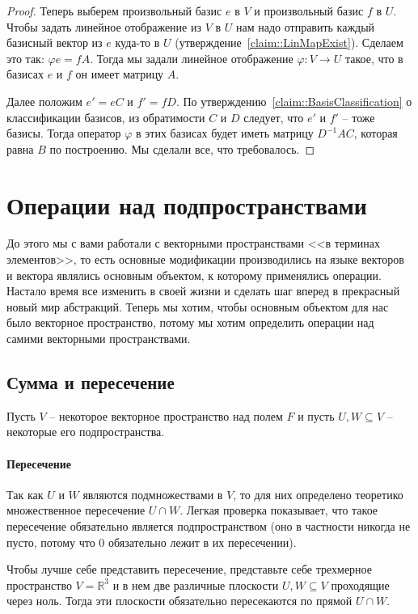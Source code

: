 \begin{proof}
Теперь выберем произвольный базис $e$ в $V$ и произвольный базис $f$ в $U$.
Чтобы задать линейное отображение из $V$ в $U$ нам надо отправить каждый базисный вектор из $e$ куда-то в $U$ (утверждение~\ref{claim::LinMapExist}).
Сделаем это так: $\varphi e = f A$.
Тогда мы задали линейное отображение $\varphi \colon V\to U$ такое, что в базисах $e$ и $f$ он имеет матрицу $A$.

Далее положим $e' = eC$ и $f' = fD$.
По утверждению~\ref{claim::BasisClassification} о классификации базисов, из обратимости $C$ и $D$ следует, что $e'$ и $f'$ -- тоже базисы.
Тогда оператор $\varphi$ в этих базисах будет иметь матрицу $D^{-1}AC$, которая равна $B$ по построению.
Мы сделали все, что требовалось.
\end{proof}


\newpage
\section{Операции над подпространствами}

До этого мы с вами работали с векторными пространствами <<в терминах элементов>>, то есть основные модификации производились на языке векторов и вектора являлись основным объектом, к которому применялись операции.
Настало время все изменить в своей жизни и сделать шаг вперед в прекрасный новый мир абстракций.
Теперь мы хотим, чтобы основным объектом для нас было векторное пространство, потому мы хотим определить операции над самими векторными пространствами.

\subsection{Сумма и пересечение}

Пусть $V$ -- некоторое векторное пространство над полем $F$ и пусть $U, W \subseteq V$ -- некоторые его подпространства.

\paragraph{Пересечение}

Так как $U$ и $W$ являются подмножествами в $V$, то для них определено теоретико множественное пересечение $U\cap W$.
Легкая проверка показывает, что такое пересечение обязательно является подпространством (оно в частности никогда не пусто, потому что $0$ обязательно лежит в их пересечении).

Чтобы лучше себе представить пересечение, представьте себе трехмерное пространство $V = \mathbb R^3$ и в нем две различные плоскости $U,W\subseteq V$ проходящие через ноль.
Тогда эти плоскости обязательно пересекаются по прямой $U\cap W$.

